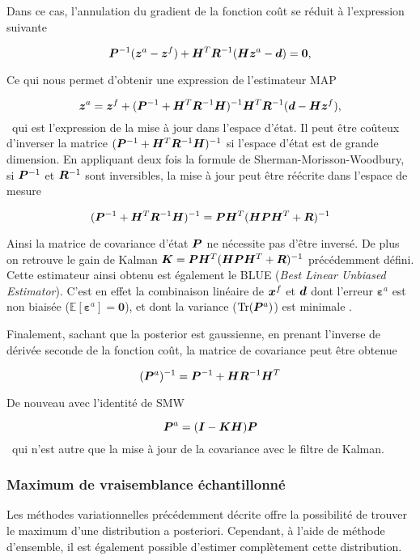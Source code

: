 Dans ce cas, l'annulation du gradient de la fonction coût se réduit à l'expression suivante

\begin{equation*}
    \bm{P}^{-1} (\bm z^a - \bm z^f) + \bm{H}^T \bm{R}^{-1}(\bm{H} \bm z^a - \bm d) = \bm 0,
\end{equation*}

Ce qui nous permet d'obtenir une expression de l'estimateur MAP

\begin{equation*}
    \bm z^a = \bm z^f + (\bm{P}^{-1} + \bm{H}^T \bm{R}^{-1} \bm{H})^{-1} \bm{H}^T \bm{R}^{-1} (\bm{d} - \bm{H} \bm z^f),
\end{equation*}~qui est l'expression de la mise à jour dans l'espace d'état. Il peut être coûteux d'inverser la matrice $(\bm{P}^{-1} + \bm{H}^T \bm{R}^{-1} \bm{H})^{-1}$ si l'espace d'état est de grande dimension. En appliquant deux fois la formule de Sherman-Morisson-Woodbury, si $\bm{P}^{-1}$ et $\bm{R}^{-1}$ sont inversibles, la mise à jour peut être réécrite dans l'espace de mesure

\begin{equation*}
    (\bm{P}^{-1} + \bm{H}^T \bm{R}^{-1} \bm{H})^{-1} = \bm{P} \bm{H}^T (\bm{H} \bm{P} \bm{H}^T + \bm{R})^{-1}
\end{equation*}

Ainsi la matrice de covariance d'état $\bm{P}$ ne nécessite pas d'être inversé. De plus on retrouve le gain de Kalman $\bm{K} = \bm{P} \bm{H}^T (\bm{H} \bm{P} \bm{H}^T + \bm{R})^{-1}$ précédemment défini. Cette estimateur ainsi obtenu est également le BLUE (\textit{Best Linear Unbiased Estimator}). C'est en effet la combinaison linéaire de $\bm{x}^f$ et $\bm{d}$ dont l'erreur $\bm \varepsilon^a$ est non biaisée ($\mathbb{E}[\bm \varepsilon^a] = \bm 0$), et dont la variance ($\operatorname{Tr}(\bm{P}^a)$) est minimale .

Finalement, sachant que la posterior est gaussienne, en prenant l'inverse de dérivée seconde de la fonction coût, la matrice de covariance peut être obtenue

\begin{equation*}
    (\bm{P}^a)^{-1} = \bm{P}^{-1} + \bm{H} \bm{R}^{-1} \bm{H}^T
\end{equation*}

De nouveau avec l'identité de SMW

\begin{equation*}
    \bm{P}^a = (\bm{I} - \bm{K} \bm{H}) \bm{P}
\end{equation*}~qui n'est autre que la mise à jour de la covariance avec le filtre de Kalman.

\subsubsection{Maximum de vraisemblance échantillonné}
Les méthodes variationnelles précédemment décrite offre la possibilité de trouver le maximum d'une distribution a posteriori. Cependant, à l'aide de méthode d'ensemble, il est également possible d'estimer complètement cette distribution.

